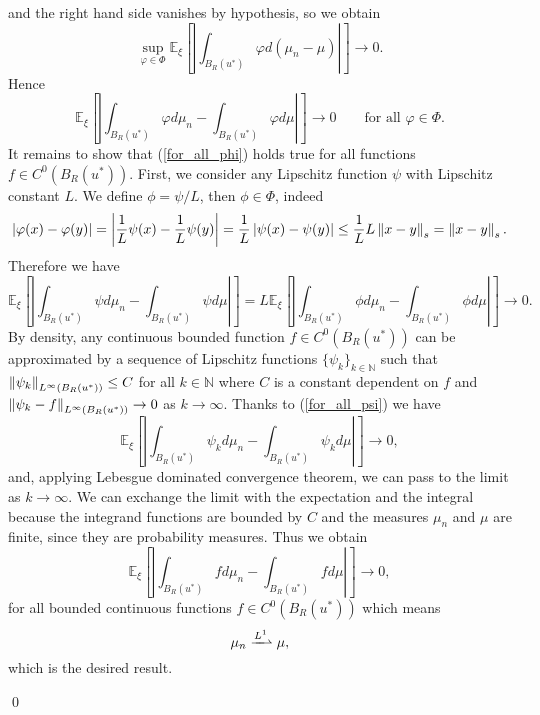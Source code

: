 and the right hand side vanishes by hypothesis, so we obtain
\[ \sup_{\varphi \in \Phi} \mathbb{E}_{\xi} \left [ \left | \int_{B_R(u^*)} \varphi d(\mu_n - \mu) \right | \right ] \to 0. \]
Hence
\begin{equation}
\label{for_all_phi}
\mathbb{E}_{\xi} \left [ \left | \int_{B_R(u^*)} \varphi d \mu_n - \int_{B_R(u^*)} \varphi d \mu \right | \right ] \to 0 \qquad \text{for all } \varphi \in \Phi.
\end{equation}
It remains to show that (\ref{for_all_phi}) holds true for all functions $f \in C^0(B_R(u^*))$. First, we consider any Lipschitz function $\psi$ with Lipschitz constant $L$. We define $\phi = \psi/L$, then $\phi \in \Phi$, indeed
\begin{equation*}
\left\lvert\varphi(x) - \varphi(y)\right\rvert = \left | \frac{1}{L} \psi(x) - \frac{1}{L} \psi(y) \right | = \frac{1}{L} \left\lvert\psi(x) - \psi(y)\right\rvert \le \frac{1}{L} L \left\|x - y\right\|_s = \left\|x - y\right\|_s.
\end{equation*}
Therefore we have
\begin{equation}
\label{for_all_psi}
\mathbb{E}_{\xi} \left [ \left | \int_{B_R(u^*)} \psi d \mu_n - \int_{B_R(u^*)} \psi d \mu \right | \right ] = L \mathbb{E}_{\xi} \left [ \left | \int_{B_R(u^*)} \phi d \mu_n - \int_{B_R(u^*)} \phi d \mu \right | \right ] \to 0.
\end{equation}
By density, any continuous bounded function $f \in C^0(B_R(u^*))$ can be approximated by a sequence of Lipschitz functions $\{ \psi_k \}_{k \in \mathbb{N}}$ such that $\left\|\psi_k\right\|_{L^{\infty}(B_R(u^*))} \le C$ for all $k \in \mathbb{N}$ where $C$ is a constant dependent on $f$ and $\left\|\psi_k - f\right\|_{L^{\infty}(B_R(u^*))} \to 0$ as $k \to \infty$. Thanks to (\ref{for_all_psi}) we have
\[ \mathbb{E}_{\xi} \left [ \left | \int_{B_R(u^*)} \psi_k d \mu_n - \int_{B_R(u^*)} \psi_k d \mu \right | \right ] \to 0, \]
and, applying Lebesgue dominated convergence theorem, we can pass to the limit as $k \to \infty$. We can exchange the limit with the expectation and the integral because the integrand functions are bounded by $C$ and the measures $\mu_n$ and $\mu$ are finite, since they are probability measures. Thus we obtain
\[ \mathbb{E}_{\xi} \left [ \left | \int_{B_R(u^*)} f d \mu_n - \int_{B_R(u^*)} f d \mu \right | \right ] \to 0, \]
for all bounded continuous functions $f \in C^0(B_R(u^*))$ which means
\[ \mu_n \xrightharpoonup{L^1} \mu, \]
which is the desired result.

\qed